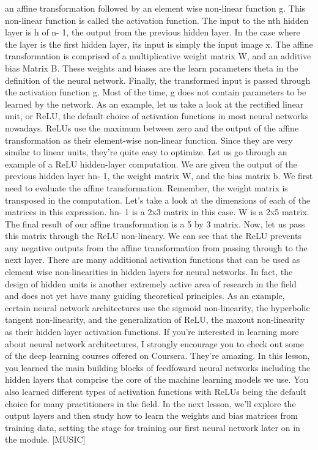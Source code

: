 an affine transformation followed by an element wise non-linear function g. This non-linear function is
called the activation function. The input to the nth
hidden layer is h of n- 1, the output from the previous hidden layer. In the case where the layer
is the first hidden layer, its input is simply the input image x. The affine transformation is
comprised of a multiplicative weight matrix W, and
an additive bias Matrix B. These weights and biases are the learn parameters theta in
the definition of the neural network. Finally, the transformed input is passed
through the activation function g. Most of the time, g does not contain
parameters to be learned by the network. As an example, let us take a look at
the rectified linear unit, or ReLU, the default choice of activation functions
in most neural networks nowadays. ReLUs use the maximum between zero and the output of the affine transformation as
their element-wise non-linear function. Since they are very similar to linear
units, they're quite easy to optimize. Let us go through an example of
a ReLU hidden-layer computation. We are given the output of
the previous hidden layer hn- 1, the weight matrix W,
and the bias matrix b. We first need to evaluate
the affine transformation. Remember, the weight matrix is
transposed in the computation. Let's take a look at the dimensions of
each of the matrices in this expression. hn- 1 is a 2x3 matrix in this case. W is a 2x5 matrix. The final result of our affine
transformation is a 5 by 3 matrix. Now, let us pass this matrix
through the ReLU non-lineary. We can see that the ReLU prevents
any negative outputs from the affine transformation from
passing through to the next layer. There are many additional activation
functions that can be used as element wise non-linearities in hidden layers for
neural networks. In fact, the design of hidden units is
another extremely active area of research in the field and does not yet
have many guiding theoretical principles. As an example, certain neural network architectures
use the sigmoid non-linearity, the hyperbolic tangent non-linearity,
and the generalization of ReLU, the maxout non-linearity as their
hidden layer activation functions. If you're interested in learning more
about neural network architectures, I strongly encourage you to check out
some of the deep learning courses offered on Coursera. They're amazing. In this lesson, you learned the main building blocks
of feedfoward neural networks including the hidden layers that comprise the core
of the machine learning models we use. You also learned different types of
activation functions with ReLUs being the default choice for
many practitioners in the field. In the next lesson,
we'll explore the output layers and then study how to learn the weights and
bias matrices from training data, setting the stage for training our first
neural network later on in the module. [MUSIC]